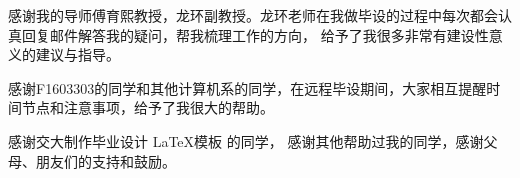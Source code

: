 

\begin{acknowledgements}
  感谢我的导师傅育熙教授，龙环副教授。龙环老师在我做毕设的过程中每次都会认真回复邮件解答我的疑问，帮我梳理工作的方向，
  给予了我很多非常有建设性意义的建议与指导。

  感谢F1603303的同学和其他计算机系的同学，在远程毕设期间，大家相互提醒时间节点和注意事项，给予了我很大的帮助。

  感谢交大制作毕业设计 \LaTeX 模板 \href{https://github.com/sjtug/SJTUThesis}{\sjtuthesis} 的同学，
  感谢其他帮助过我的同学，感谢父母、朋友们的支持和鼓励。
\end{acknowledgements}

